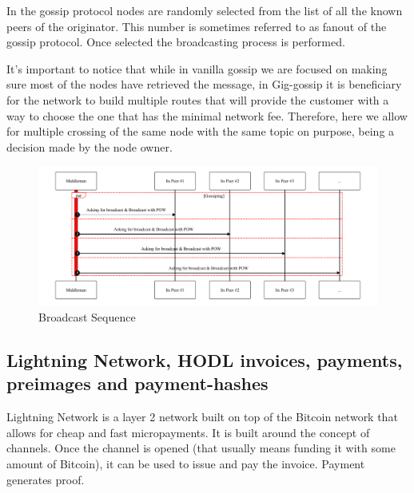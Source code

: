\documentclass{article}
\begin{document}
In the gossip protocol nodes are randomly selected from the list of all the known peers of the originator. This number is sometimes referred to as fanout \cite{Fanout} of the gossip protocol. Once selected the broadcasting process is performed.

It's important to notice that while in vanilla gossip we are focused on making sure most of the nodes have retrieved the message, in Gig-gossip it is beneficiary for the network to build multiple routes that will provide the customer with a way to choose the one that has the minimal network fee. Therefore, here we allow for multiple crossing of the same node with the same topic on purpose, being a decision made by the node owner.

\begin{figure}
	\centering
	\includegraphics[scale=0.8]{BroadcastSequence.pdf}
	\caption{Broadcast Sequence}
	\label{fig:fr:broadcastsequence}
\end{figure}

\subsection{Lightning Network, HODL invoices, payments, preimages and payment-hashes}

Lightning Network is a layer 2 network built on top of the Bitcoin network that allows for cheap and fast micropayments. It is built around the concept of channels. Once the channel is opened (that usually means funding it with some amount of Bitcoin), it can be used to issue and pay the invoice. Payment generates proof. 
\end{document}

